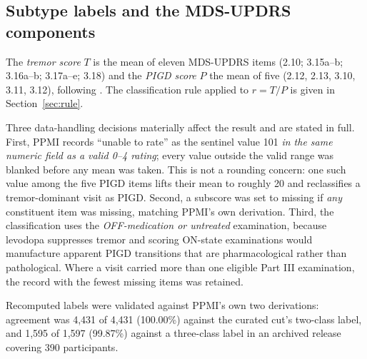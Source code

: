 \documentclass[11pt]{article}
\begin{document}
\begin{table}[t]
\centering
\caption{Cohort characteristics. Continuous variables are measured at the
participant's first visit and reported as median (interquartile range). The
subtype distribution at the first visit is over the 1,076 first visits that
carry a label. The modelling cohort is the subset of patients contributing at
least one visit-to-visit transition.}
\label{tab:cohort}
\small

\end{table}

\subsection{Subtype labels and the MDS-UPDRS components}
\label{sec:labels}
The \emph{tremor score} $T$ is the mean of eleven MDS-UPDRS items (2.10;
3.15a--b; 3.16a--b; 3.17a--e; 3.18) and the \emph{PIGD score} $P$ the mean of
five (2.12, 2.13, 3.10, 3.11, 3.12), following \citet{stebbins2013}. The
classification rule applied to $r = T/P$ is given in Section~\ref{sec:rule}.

Three data-handling decisions materially affect the result and are stated in
full. First, PPMI records ``unable to rate'' as the sentinel value 101 \emph{in
the same numeric field as a valid 0--4 rating}; every value outside the valid
range was blanked before any mean was taken. This is not a rounding concern: one
such value among the five PIGD items lifts their mean to roughly 20 and
reclassifies a tremor-dominant visit as PIGD. Second, a subscore was set to
missing if \emph{any} constituent item was missing, matching PPMI's own
derivation. Third, the classification uses the \emph{OFF-medication or
untreated} examination, because levodopa suppresses tremor and scoring
ON-state examinations would manufacture apparent PIGD transitions that are
pharmacological rather than pathological. Where a visit carried more than one
eligible Part III examination, the record with the fewest missing items was
retained.

Recomputed labels were validated against PPMI's own two derivations: agreement
was 4,431 of 4,431 (100.00\%) against the curated cut's two-class label, and
1,595 of 1,597 (99.87\%) against a three-class label in an archived release
covering 390 participants.
\end{document}
